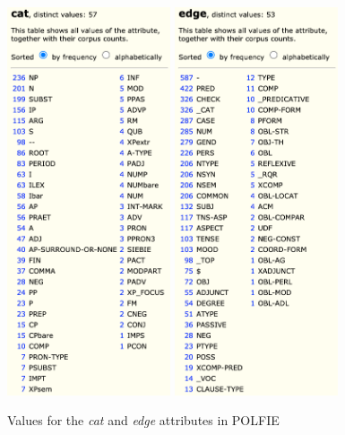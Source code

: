 \documentclass[output=paper,hidelinks]{langscibook}
\begin{document}
\begin{figure}
    \includegraphics[width=0.43\textwidth]{figures/Treebanks/categories.png}
    \hfill
    \includegraphics[width=0.43\textwidth]{figures/Treebanks/edges.png}
    \caption{Values for the \textit{cat} and \textit{edge} attributes in POLFIE}
    \label{fig:cat}
\end{figure}
\end{document}
